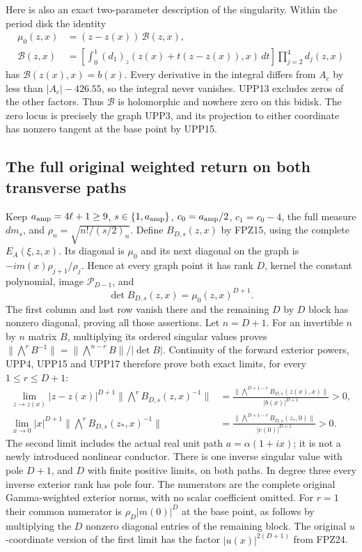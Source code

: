 Here is also an exact two-parameter description of the singularity.
Within the period disk the identity
\[
 \begin{aligned}
 \mu_0(z,x)&=(z-z(x))\,\mathcal B(z,x),\\
 \mathcal B(z,x)&=
 \left[\int_0^1(d_1)_z(z(x)+t(z-z(x)),x)\,dt\right]
                  \prod_{j=2}^4d_j(z,x)
 \end{aligned}\tag{UPP16}
\]
has $\mathcal B(z(x),x)=b(x)$.
Every derivative in the integral differs from $A_c$ by less than
$|A_c|-426.55$, so the integral never vanishes. UPP13 excludes
zeros of the other factors. Thus $\mathcal B$ is holomorphic and
nowhere zero on this bidisk. The zero locus is precisely the graph
UPP3, and its projection to either coordinate has nonzero tangent
at the base point by UPP15.

\subsection{The full original weighted return on both transverse paths}
Keep $a_{\rm amp}=4\ell+1\ge9$, $s\in\{1,a_{\rm amp}\}$,
$c_0=a_{\rm amp}/2$, $c_1=c_0-4$, the full measure $dm_s$,
and $\rho_n=\sqrt{n!/(s/2)_n}$. Define $B_{D,s}(z,x)$ by FPZ15,
using the complete $E_A(\xi,z,x)$. Its diagonal is $\mu_0$ and
its next diagonal on the graph is $-im(x)\rho_{j+1}/\rho_j$.
Hence at every graph point it has rank $D$, kernel the constant
polynomial, image $\mathcal P_{D-1}$, and
\[
 \det B_{D,s}(z,x)=\mu_0(z,x)^{D+1}.
 \tag{UPP17}
\]
The first column and last row vanish there and the remaining
$D$ by $D$ block has nonzero diagonal, proving all those assertions.
Let $n=D+1$. For an invertible $n$ by $n$ matrix $B$, multiplying
its ordered singular values proves
$\|\bigwedge^r B^{-1}\|=\|\bigwedge^{n-r}B\|/|\det B|$.
Continuity of the forward exterior powers, UPP4, UPP15 and UPP17
therefore prove both exact limits, for every $1\le r\le D+1$:
\[
 \begin{aligned}
 \lim_{z\to z(x)} |z-z(x)|^{D+1}
       \|\bigwedge^r B_{D,s}(z,x)^{-1}\|
 &=\frac{\|\bigwedge^{D+1-r}B_{D,s}(z(x),x)\|}{|b(x)|^{D+1}}>0,\\
 \lim_{x\to0} |x|^{D+1}
       \|\bigwedge^r B_{D,s}(z_*,x)^{-1}\|
 &=\frac{\|\bigwedge^{D+1-r}B_{D,s}(z_*,0)\|}{|e(0)|^{D+1}}>0.
 \end{aligned}\tag{UPP18}
\]
The second limit includes the actual real unit path
$a=\alpha(1+ix)$; it is not a newly introduced nonlinear conductor.
There is one inverse singular value with pole $D+1$, and $D$ with
finite positive limits, on both paths. In degree three every inverse
exterior rank has pole four. The numerators are the complete original
Gamma-weighted exterior norms, with no scalar coefficient omitted.
For $r=1$ their common numerator is $\rho_D|m(0)|^D$ at the base
point, as follows by multiplying the $D$ nonzero diagonal entries
of the remaining block. The original $u$-coordinate version of the
first limit has the factor $|u(x)|^{2(D+1)}$ from FPZ24.

